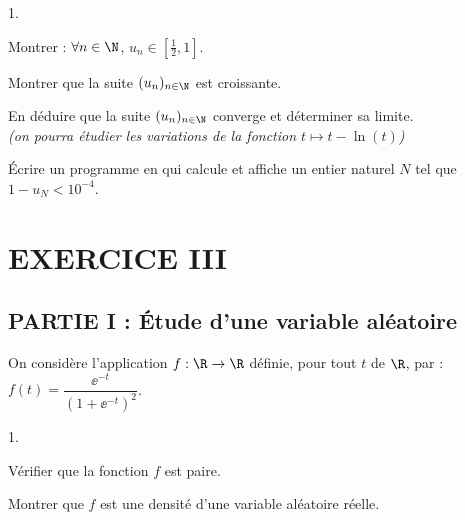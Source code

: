 \begin{noliste}{1.}
\setlength{\itemsep}{2mm}
\setcounter{enumi}{8}
\item Montrer : $\forall n\in \N$, $u_n \in \left[\frac{1}{2},
    1\right]$.

  

\item Montrer que la suite $(u_n)_{n\in \N}$ est croissante.

  

\item En déduire que la suite $(u_n)_{n\in \N}$ converge et déterminer
  sa limite.\\
  {\it (on pourra étudier les variations de la fonction $t\mapsto
    t-\ln(t)$)}



\item Écrire un programme en \Scilab{} qui calcule et affiche un entier 
naturel $N$ tel que $1-u_N<10^{-4}$.



\end{noliste}

\newpage

\section*{EXERCICE III}


\subsection*{PARTIE I : Étude d'une variable aléatoire}

\noindent
On considère l'application $f:\R\rightarrow\R$ définie, 
pour tout $t$ de $\R$, par : 
$f(t)=\dfrac{\ee^{-t}}{(1+\ee^{-t})^2}$.

\begin{noliste}{1.}
\setlength{\itemsep}{4mm}
\item Vérifier que la fonction $f$ est paire.








\item Montrer que  $f$ est une densité d'une variable aléatoire réelle.



\end{noliste}


